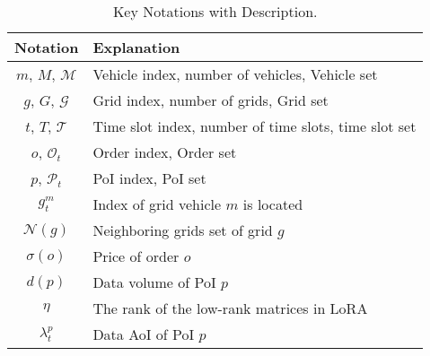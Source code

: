 \begin{table}[t]

\caption{Key Notations with Description.}
\label{table:notation}
\centering
\begin{threeparttable}
\begin{tabular}{c p{6cm}}
\toprule
Notation & Explanation \\
\midrule
{$m$, $M$, $\mathcal{M}$} & Vehicle index, number of vehicles, Vehicle set \\

\midrule
{$g$, $G$, $\mathcal{G}$} & Grid index, number of grids, Grid set\\

\midrule
{$t$, $T$, $\mathcal{T}$} & Time slot index, number of time slots, time slot set\\

\midrule
{$o$, $\mathcal{O}_t$} & Order index, Order set\\

\midrule
{$p$, $\mathcal{P}_t$} & PoI index, PoI set\\

\midrule
{$g_t^m$} & Index of grid vehicle $m$ is located\\

\midrule
{$\mathcal{N}(g)$} & Neighboring grids set of grid $g$\\

\midrule
{$\sigma(o)$} & Price of order $o$\\

\midrule
{$d\left(p\right)$} & Data volume of PoI $p$\\

\midrule
{$\eta$} & The rank of the low-rank matrices in LoRA\\

\midrule
{$\lambda_{t}^p$} & Data AoI of PoI $p$\\


\end{tabular}
\end{threeparttable}
\end{table}

